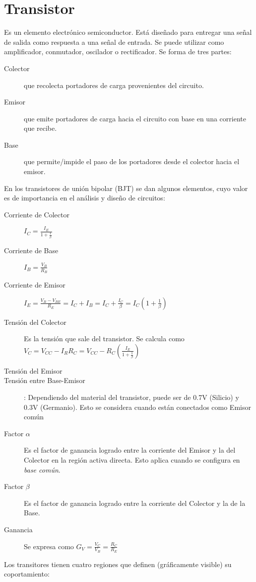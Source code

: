 \documentclass[12pt,spanish,lettersize]{report}
\begin{document}
\section{Transistor}
Es un elemento electr\'onico semiconductor. Est\'a dise\~nado para entregar una se\~nal de salida como respuesta a una se\~nal de entrada. Se puede utilizar como amplificador, conmutador, oscilador o rectificador. Se forma de tres partes:
\begin{description}
\item[Colector] que recolecta portadores de carga provenientes del circuito.
\item[Emisor] que emite portadores de carga hacia el circuito con base en una corriente que recibe.
\item[Base] que permite/impide el paso de los portadores desde el colector hacia el emisor.
\end{description}
En los transistores de uni\'on bipolar (BJT) se dan algunos elementos, cuyo valor es de importancia en el an\'alisis y dise\~no de circuitos:
\begin{description}
\item[Corriente de Colector] $I_C=\frac{I_E}{1+\frac{1}{\beta}}$
\item[Corriente de Base] $I_B=\frac{V_B}{R_B}$
\item[Corriente de Emisor] $I_E=\frac{V_B-V_{BE}}{R_E}=I_C+I_B=I_C+\frac{I_C}{\beta}=I_C(1+\frac{1}{\beta})$
\item[Tensi\'on del Colector] Es la tensi\'on que sale del transistor. Se calcula como $V_C=V_{CC}-I_RR_C=V_{CC}-R_C\left(\frac{I_E}{1+\frac{1}{\beta}}\right)$
\item[Tensi\'on del Emisor]
\item[Tensi\'on entre Base-Emisor]: Dependiendo del material del transistor, puede ser de 0.7V (Silicio) y 0.3V (Germanio). Esto se considera cuando est\'an conectados como Emisor com\'un
\item[Factor $\alpha$]Es el factor de ganancia logrado entre la corriente del Emisor y la del Colector en la regi\'on activa directa. Esto aplica cuando se configura en \emph{base com\'un}.
\item[Factor $\beta$] Es el factor de ganancia logrado entre la corriente del Colector y la de la Base.
\item[Ganancia] Se expresa como $G_V=\frac{V_C}{V_B}=\frac{R_C}{R_E}$
\end{description}
Los transitores tienen cuatro regiones que definen (gr\'aficamente visible) su coportamiento:
\end{document}
